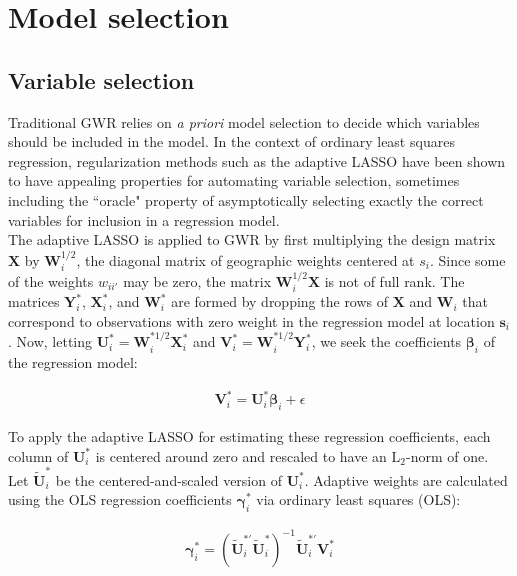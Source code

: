 \documentclass[authoryear, review, 11pt]{elsarticle}
\begin{document}
	
	 
	
\section{Model selection \label{section:method}}
	\subsection{Variable selection}
	Traditional GWR relies on \emph{a priori} model selection to decide which variables should be included in the model. In the context of ordinary least squares regression, regularization methods such as the adaptive LASSO \citep{Zou:2006} have been shown to have appealing properties for automating variable selection, sometimes including the ``oracle" property of asymptotically selecting exactly the correct variables for inclusion in a regression model.\\
	
	The adaptive LASSO is applied to GWR by first multiplying the design matrix $\bm{X}$ by $\bm{W}_i^{1/2}$, the diagonal matrix of geographic weights centered at $s_i$. Since some of the weights $w_{ii'}$ may be zero, the matrix $\bm{W}_i^{1/2}\bm{X}$ is not of full rank. The matrices $\bm{Y}_i^*$, $\bm{X}_i^*$, and $\bm{W}_i^*$ are formed by dropping the rows of $\bm{X}$  and $\bm{W}_i$ that correspond to observations with zero weight in the regression model at location $\bm{s}_i$. Now, letting $\bm{U}_i^* = \bm{W}_i^{*1/2} \bm{X}_i^*$ and $\bm{V}_i^* = \bm{W}_i^{*1/2} \bm{Y}_i^*$, we seek the coefficients $\bm{\beta}_i$ of the regression model:
	
	\begin{eqnarray}
		\bm{V}_i^* = \bm{U}_i^* \bm{\beta}_i + \epsilon
	\end{eqnarray}
	
	To apply the adaptive LASSO for estimating these regression coefficients, each column of $\bm{U}_i^*$ is centered around zero and rescaled to have an $\mbox{L}_2$-norm of one. Let $\widetilde{\bm{U}}_i^*$ be the centered-and-scaled version of $\bm{U}_i^*$. Adaptive weights are calculated using the OLS regression coefficients $\bm{\gamma}_i^*$ via ordinary least squares (OLS):
	
	\begin{eqnarray}\label{eq:adaptive-weights-regression}
		\bm{\gamma}_i^* = \left( \widetilde{\bm{U}}_i^{*'} \widetilde{\bm{U}}_i^* \right)^{-1} \widetilde{\bm{U}}_i^{*'} \bm{V}_i^*
	\end{eqnarray}
	
\end{document}
